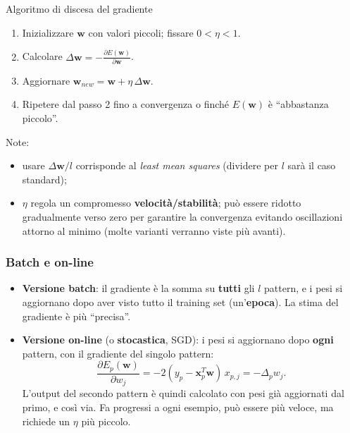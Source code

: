 \begin{boxabstract}{Algoritmo di discesa del gradiente}

\begin{enumerate}
\def\labelenumi{\arabic{enumi}.}
\tightlist
\item
  Inizializzare \(\mathbf{w}\) con valori piccoli; fissare
  \(0 < \eta < 1\).
\item
  Calcolare
  \(\Delta\mathbf{w} = -\frac{\partial E(\mathbf{w})}{\partial \mathbf{w}}\).
\item
  Aggiornare \(\mathbf{w}_{new} = \mathbf{w} + \eta\,\Delta\mathbf{w}\).
\item
  Ripetere dal passo 2 fino a convergenza o finché \(E(\mathbf{w})\) è
  ``abbastanza piccolo''.
\end{enumerate}

\end{boxabstract}

Note:

\begin{itemize}
\tightlist
\item
  usare \(\Delta\mathbf{w}/l\) corrisponde al \emph{least mean squares}
  (dividere per \(l\) sarà il caso standard);
\item
  \(\eta\) regola un compromesso \textbf{velocità/stabilità}; può essere
  ridotto gradualmente verso zero per garantire la convergenza evitando
  oscillazioni attorno al minimo (molte varianti verranno viste più
  avanti).
\end{itemize}

\subsubsection{Batch e on-line}\label{batch-e-on-line}

\begin{itemize}
\tightlist
\item
  \textbf{Versione batch}: il gradiente è la somma su \textbf{tutti} gli
  \(l\) pattern, e i pesi si aggiornano dopo aver visto tutto il
  training set (un'\textbf{epoca}). La stima del gradiente è più
  ``precisa''.
\item
  \textbf{Versione on-line} (o \textbf{stocastica}, SGD): i pesi si
  aggiornano dopo \textbf{ogni} pattern, con il gradiente del singolo
  pattern: \[
  \frac{\partial E_p(\mathbf{w})}{\partial w_j} = -2(y_p - \mathbf{x}_p^T\mathbf{w})\, x_{p,j} = -\Delta_p w_j.
  \] L'output del secondo pattern è quindi calcolato con pesi già
  aggiornati dal primo, e così via. Fa progressi a ogni esempio, può
  essere più veloce, ma richiede un \(\eta\) più piccolo.
\end{itemize}

